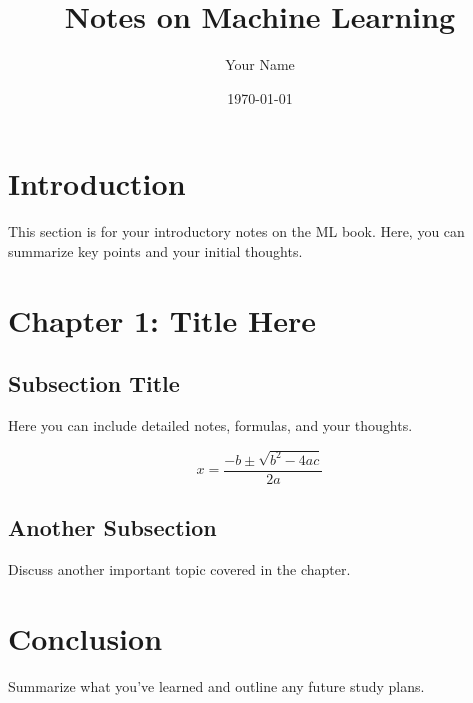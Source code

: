 
\usepackage{amsmath} 
\usepackage{amsfonts}
\usepackage{amssymb} 
\usepackage{graphicx} 
\usepackage{hyperref} 
\usepackage{listings} 
\usepackage{booktabs} 
\usepackage{algorithm}
\usepackage{algorithmic} 
\usepackage[utf8]{inputenc} 
\usepackage{geometry} 

\geometry{
    a4paper,
    margin=1in
}

\title{Notes on Machine Learning}
\author{Your Name}
\date{\today}

\beginforum
\maketitle

\tableofcontents
\newpage

\section{Introduction}
This section is for your introductory notes on the ML book. Here, you can summarize key points and your initial thoughts.

\section{Chapter 1: Title Here}
\subsection{Subsection Title}
Here you can include detailed notes, formulas, and your thoughts.

\begin{equation}
    x = \frac{-b \pm \sqrt{b^2 - 4ac}}{2a}
\end{equation}

\subsection{Another Subsection}
Discuss another important topic covered in the chapter.

\section{Conclusion}
Summarize what you've learned and outline any future study plans.


